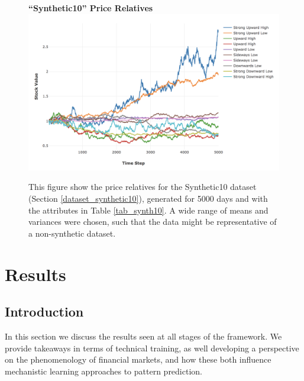 \documentclass[a4paper,11pt,oneside]{article}
\theoremstyle{plain}
\theoremstyle{definition}
\begin{document}
	
	
	\begin{figure}[H]
		\centering
		\textbf{``Synthetic10'' Price Relatives}
		\includegraphics[scale=0.45]{images/results/prices/synthetic10_prices.png} 
		\caption[Synthetic10 Price Relatives]{This figure show the price relatives for the Synthetic10 dataset (Section \ref{dataset_synthetic10}), generated for 5000 days and with the attributes in Table \ref{tab_synth10}. A wide range of means and variances were chosen, such that the data might be representative of a non-synthetic dataset.}
		\label{figure-synthetic10_prices}
	\end{figure}
	

	
	
	
	
	
	
	
	
	
	\newpage
	\section{Results}\label{Results}
	\subsection{Introduction}\label{results_into}
	
	In this section we discuss the results seen at all stages of the framework. We provide takeaways in terms of technical training, as well developing a perspective on the phenomenology of financial markets, and how these both influence mechanistic learning approaches to pattern prediction. \newline
	
\end{document}
